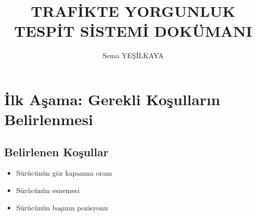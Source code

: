 \documentclass[12pt, a4paper]{article}
\title{TRAFİKTE YORGUNLUK TESPİT SİSTEMİ DOKÜMANI}
\author{Sema YEŞİLKAYA}
\begin{document}
	\maketitle \newpage
	\tableofcontents{}  \newpage
\section{İlk Aşama: Gerekli Koşulların Belirlenmesi}
 \subsection{Belirlenen Koşullar}
 \begin{itemize}
 	\item Sürücünün göz kapanma oranı
 	\item Sürücünün esnemesi
 	\item Sürücünün başının pozisyonu
 	\end{itemize}
\end{document}
